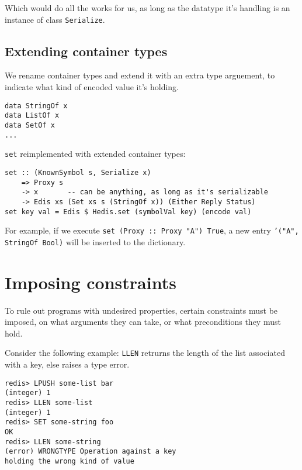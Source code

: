 \documentclass[pldi]{sigplanconf-pldi16}
\begin{document}
Which would do all the works for us, as long as the datatype it's handling is
an instance of class \texttt{Serialize}.\footnotemark


\subsection{Extending container types}
We rename container types and extend it with an extra type arguement,
 to indicate what kind of encoded value it's holding.

\begin{verbatim}
data StringOf x
data ListOf x
data SetOf x
...
\end{verbatim}

\texttt{set} reimplemented with extended container types:

\begin{verbatim}
set :: (KnownSymbol s, Serialize x)
    => Proxy s
    -> x       -- can be anything, as long as it's serializable
    -> Edis xs (Set xs s (StringOf x)) (Either Reply Status)
set key val = Edis $ Hedis.set (symbolVal key) (encode val)
\end{verbatim}

For example, if we execute \texttt{set (Proxy :: Proxy "A") True},
a new entry \texttt{'}\texttt{("A", StringOf Bool)} will
be inserted to the dictionary.

\section{Imposing constraints}

To rule out programs with undesired properties, certain constraints must be
imposed, on what arguments they can take, or what preconditions they must hold.

Consider the following example: \texttt{LLEN} retrurns the length of
the list associated with a key, else raises a type error.

\begin{verbatim}
redis> LPUSH some-list bar
(integer) 1
redis> LLEN some-list
(integer) 1
redis> SET some-string foo
OK
redis> LLEN some-string
(error) WRONGTYPE Operation against a key
holding the wrong kind of value
\end{verbatim}
\end{document}
